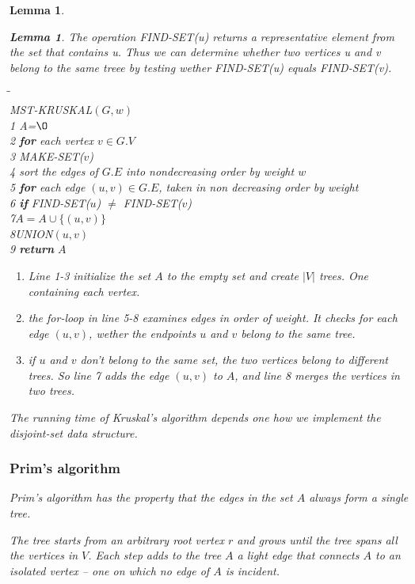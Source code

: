 \documentclass[a4paper,11pt]{book}
\newtheorem{lemma}[theorem]{Lemma}
\begin{document}
{\begin{lemma}
\begin{lemma}
The operation FIND-SET(u) returns a representative element from the set that contains u. Thus we can determine whether two vertices u and v belong to the same treee by testing wether FIND-SET(u) equals FIND-SET(v).
\begin{tabbing}
\hspace{.8cm}\=\hspace{.8cm}\=\hspace{.8cm}\\
MST-KRUSKAL$(G,w)$\\
1 \> A=$\O$ \\
2 \> \textbf{for} each vertex $v \in G.V$\\
3 \>\> MAKE-SET($v$)\\
4 \>sort the edges of $G.E$ into nondecreasing order by weight $w$\\
5 \>\textbf{for} each edge $(u,v)\in G.E$, taken in non decreasing order by weight\\
6 \>\> \textbf{if} FIND-SET($u$) $\neq$ FIND-SET($v$)\\
7\>\>$A=A\cup \{(u,v)\}$\\
8\>\>UNION$(u,v)$\\
9 \>\textbf{return} $A$
\end{tabbing}
\begin{enumerate}
\item Line 1-3 initialize the set $A$ to the empty set and create $|V|$ trees. One containing each vertex.
\item the for-loop in line 5-8 examines edges in order of weight. It checks for each edge $(u,v)$, wether the endpoints $u$ and $v$ belong to the same tree.
\item if $u$ and $v$ don't belong to the same set, the two vertices belong to different trees. So line 7 adds the edge $(u,v)$ to $A$, and line 8 merges the vertices in two trees.
\end{enumerate}
The running time of Kruskal's algorithm depends one how we implement the disjoint-set data structure.
\subsubsection{Prim's algorithm}
Prim's algorithm has the property that the edges in the set $A$ always form a single tree.

The tree starts from an arbitrary root vertex $r$ and grows until the tree spans all the vertices in $V$. Each step adds to the tree $A$ a light edge that connects $A$ to an isolated vertex -- one on which no edge of $A$ is incident.


\end{lemma}
\end{lemma}}
\end{document}
